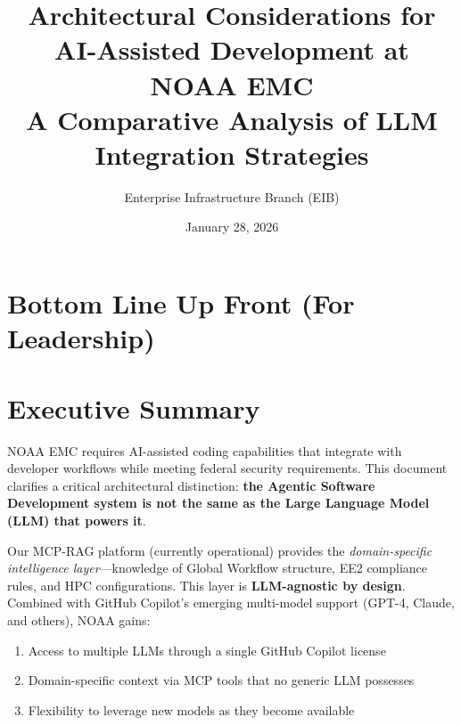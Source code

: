 \documentclass[11pt]{article}
\title{\textbf{Architectural Considerations for\\AI-Assisted Development at NOAA EMC}\\[0.5em]\large A Comparative Analysis of LLM Integration Strategies}
\author{Enterprise Infrastructure Branch (EIB)}
\date{January 28, 2026}
\begin{document}
\maketitle
\thispagestyle{empty}

\section*{Bottom Line Up Front (For Leadership)}

\noindent{}

\vspace{1.5em}

\section*{Executive Summary}

NOAA EMC requires AI-assisted coding capabilities that integrate with developer workflows while meeting federal security requirements. This document clarifies a critical architectural distinction: \textbf{the Agentic Software Development system is not the same as the Large Language Model (LLM) that powers it}.

Our MCP-RAG platform (currently operational) provides the \textit{domain-specific intelligence layer}---knowledge of Global Workflow structure, EE2 compliance rules, and HPC configurations. This layer is \textbf{LLM-agnostic by design}. Combined with GitHub Copilot's emerging multi-model support (GPT-4, Claude, and others), NOAA gains:
\begin{enumerate}[itemsep=2pt]
    \item Access to multiple LLMs through a single GitHub Copilot license
    \item Domain-specific context via MCP tools that no generic LLM possesses
    \item Flexibility to leverage new models as they become available
\end{enumerate}
\end{document}
